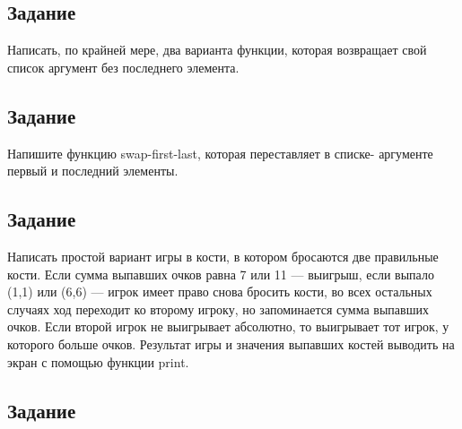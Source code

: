 \subsection{Задание }

Написать, по крайней мере, два варианта функции, которая возвращает свой список аргумент без последнего элемента.


\subsection{Задание }

Напишите функцию swap-first-last, которая переставляет в списке- аргументе первый и последний элементы.


\subsection{Задание }

 Написать простой вариант игры в кости, в котором бросаются две правильные кости. Если сумма выпавших очков равна 7 или 11 — выигрыш, если выпало (1,1) или (6,6) — игрок имеет право снова бросить кости, во всех остальных случаях ход переходит ко второму игроку, но запоминается сумма выпавших очков. Если второй игрок не выигрывает абсолютно, то выигрывает тот игрок, у которого больше очков. Результат игры и значения выпавших костей выводить на экран с помощью функции print.


\subsection{Задание }

